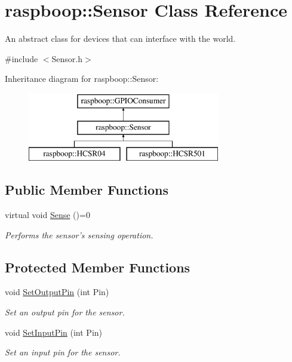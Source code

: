 \hypertarget{classraspboop_1_1Sensor}{\section{raspboop\-:\-:Sensor Class Reference}
\label{classraspboop_1_1Sensor}
}


An abstract class for devices that can interface with the world.  




{\ttfamily \#include $<$Sensor.\-h$>$}

Inheritance diagram for raspboop\-:\-:Sensor\-:\begin{figure}[H]
\begin{center}
\leavevmode
\includegraphics[height=3.000000cm]{classraspboop_1_1Sensor}
\end{center}
\end{figure}
\subsection*{Public Member Functions}
\begin{DoxyCompactItemize}
\item 
virtual void \hyperlink{classraspboop_1_1Sensor_ab854a10682373803a310c078bb71aacf}{Sense} ()=0
\begin{DoxyCompactList}\small\item\em Performs the sensor's sensing operation. \end{DoxyCompactList}\end{DoxyCompactItemize}
\subsection*{Protected Member Functions}
\begin{DoxyCompactItemize}
\item 
void \hyperlink{classraspboop_1_1Sensor_a893f7ad09018028fdb9e10f0bcbeccf9}{Set\-Output\-Pin} (int Pin)
\begin{DoxyCompactList}\small\item\em Set an output pin for the sensor. \end{DoxyCompactList}\item 
void \hyperlink{classraspboop_1_1Sensor_ad0b3f0fa153803108613e3c3da574571}{Set\-Input\-Pin} (int Pin)
\begin{DoxyCompactList}\small\item\em Set an input pin for the sensor. \end{DoxyCompactList}\end{DoxyCompactItemize}


